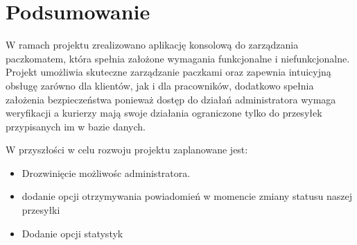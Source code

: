\chapter{Podsumowanie}

W ramach projektu zrealizowano aplikację konsolową do zarządzania paczkomatem, która spełnia założone wymagania funkcjonalne i niefunkcjonalne. Projekt umożliwia skuteczne zarządzanie paczkami oraz zapewnia intuicyjną obsługę zarówno dla klientów, jak i dla pracowników, dodatkowo spełnia założenia bezpieczeństwa ponieważ dostęp do działań administratora wymaga weryfikacji a kurierzy mają swoje działania ograniczone tylko do przesyłek przypisanych im w bazie danych.

W przyszłości w celu rozwoju projektu zaplanowane jest:
\begin{itemize}
  \item Drozwinięcie możliwośc administratora.
  \item dodanie opcji otrzymywania powiadomień w momencie zmiany statusu naszej przesyłki 
  \item Dodanie opcji statystyk
\end{itemize}



